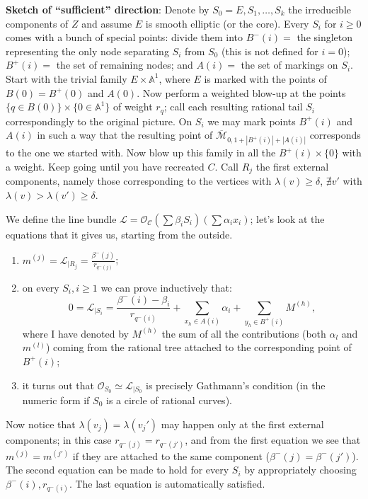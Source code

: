 \documentclass[11pt]{amsart}
\newcommand{\oM}{\overline{\mathcal{M}}}
\newcommand{\OO}{\mathcal{O}}
\newcommand{\cC}{\mathcal C}
\newcommand{\Aaff}{\mathbb{A}}
\theoremstyle{definition}
\theoremstyle{definition}
\begin{document}
\textbf{Sketch of ``sufficient'' direction}: Denote by $S_0=E,S_1,\ldots,S_k$ the irreducible components of $Z$ and assume $E$ is smooth elliptic (or the core). Every $S_i$ for $i\geq 0$ comes with a bunch of special points: divide them into $B^-(i)=$ the singleton representing the only node separating $S_i$ from $S_0$ (this is not defined for $i=0$); $B^+(i)=$ the set of remaining nodes; and $A(i)=$ the set of markings on $S_i$. Start with the trivial family $E\times\Aaff^1$, where $E$ is marked with the points of $B(0)=B^+(0)$ and $A(0)$. Now perform a weighted blow-up at the points $\{q\in B(0)\}\times\{0\in\Aaff^1\}$ of weight $r_q$; call each resulting rational tail $S_i$ correspondingly to the original picture. On $S_i$ we may mark points $B^+(i)$ and $A(i)$ in such a way that the resulting point of $\oM_{0,1+|B^+(i)|+|A(i)|}$ corresponds to the one we started with. Now blow up this family in all the $B^+(i)\times\{0\}$ with a weight. Keep going until you have recreated $C$. Call $R_j$ the first external components, namely those corresponding to the vertices with $\lambda(v)\geq\delta$, $\nexists v'$ with $\lambda(v)>\lambda(v')\geq\delta$.

We define the line bundle $\mathcal L=\OO_{\cC}(\sum \beta_iS_i)(\sum \alpha_ix_i)$; let's look at the equations that it gives us, starting from the outside.
\begin{enumerate}
 \item $m^{(j)}=\mathcal L_{|R_j}=\frac{\beta^-(j)}{r_{q^-(j)}}$;
 \item on every $S_i, i\geq1$ we can prove inductively that:
 \[0=\mathcal L_{|S_i}=\frac{\beta^-(i)-\beta_i}{r_{q^-(i)}}+\sum_{x_h\in A(i)}\alpha_i+\sum_{y_h\in B^+(i)}M^{(h)},\]
 where I have denoted by $M^{(h)}$ the sum of all the contributions (both $\alpha_l$ and $m^{(l)}$) coming from the rational tree attached to the corresponding point of $B^+(i)$;
 \item it turns out that $\OO_{S_0}\simeq\mathcal L_{|S_0}$ is precisely Gathmann's condition (in the numeric form if $S_0$ is a circle of rational curves). 
\end{enumerate}
Now notice that $\lambda(v_j)=\lambda(v_j')$ may happen only at the first external components;  in this case $r_{q^-(j)}=r_{q^-(j')}$, and from the first equation we see that $m^{(j)}=m^{(j')}$ if they are attached to the same component ($\beta^-(j)=\beta^-(j')$).
The second equation can be made to hold for every $S_i$ by appropriately choosing $\beta^-(i), r_{q^-(i)}$. The last equation is automatically satisfied.
\end{document}
